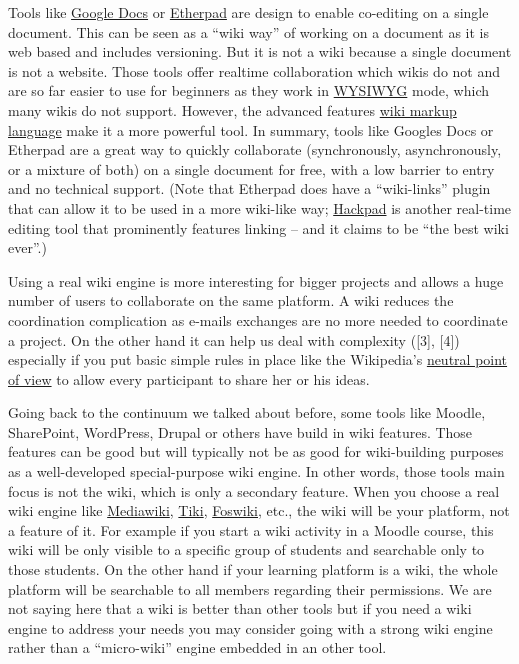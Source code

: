 Tools like \href{https://docs.google.com/}{Google Docs} or
\href{http://en.wikipedia.org/wiki/Etherpad}{Etherpad} are design to
enable co-editing on a single document. This can be seen as a ``wiki
way'' of working on a document as it is web based and includes
versioning. But it is not a wiki because a single document is not a
website. Those tools offer realtime collaboration which wikis do not and
are so far easier to use for beginners as they work in
\href{http://en.wikipedia.org/wiki/WYSIWYG}{WYSIWYG} mode, which many
wikis do not support. However, the advanced features
\href{http://en.wikipedia.org/wiki/Wiki\_syntax}{wiki markup language}
make it a more powerful tool. In summary, tools like Googles Docs or
Etherpad are a great way to quickly collaborate (synchronously,
asynchronously, or a mixture of both) on a single document for free,
with a low barrier to entry and no technical support. (Note that
Etherpad does have a ``wiki-links'' plugin that can allow it to be used
in a more wiki-like way; \href{https://hackpad.com/}{Hackpad} is another
real-time editing tool that prominently features linking -- and it
claims to be ``the best wiki ever''.)

Using a real wiki engine is more interesting for bigger projects and
allows a huge number of users to collaborate on the same platform. A
wiki reduces the coordination complication as e-mails exchanges are no
more needed to coordinate a project. On the other hand it can help us
deal with complexity ({[}3{]}, {[}4{]}) especially if you put basic simple
rules in place like the Wikipedia's
\href{http://en.wikipedia.org/wiki/NPOV}{neutral point of view} to allow
every participant to share her or his ideas.

Going back to the continuum we talked about before, some tools like
Moodle, SharePoint, WordPress, Drupal or others have build in wiki
features. Those features can be good but will typically not be as good
for wiki-building purposes as a well-developed special-purpose wiki
engine. In other words, those tools main focus is not the wiki, which is
only a secondary feature. When you choose a real wiki engine like
\href{http://www.mediawiki.org/}{Mediawiki},
\href{http://www.tiki.org/}{Tiki}, \href{http://foswiki.org/}{Foswiki},
etc., the wiki will be your platform, not a feature of it. For example
if you start a wiki activity in a Moodle course, this wiki will be only
visible to a specific group of students and searchable only to those
students. On the other hand if your learning platform is a wiki, the
whole platform will be searchable to all members regarding their
permissions. We are not saying here that a wiki is better than other
tools but if you need a wiki engine to address your needs you may
consider going with a strong wiki engine rather than a ``micro-wiki''
engine embedded in an other tool.


